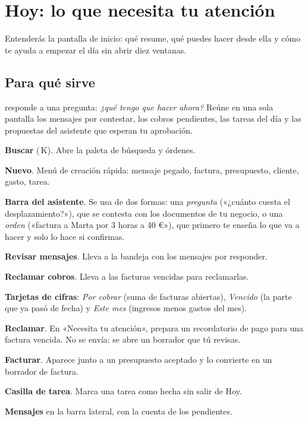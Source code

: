 \chapter{Hoy: lo que necesita tu atención}\label{cap:hoy}

\begin{objbox}
Entenderás la pantalla de inicio: qué resume, qué puedes hacer desde ella y cómo te ayuda a empezar el día sin abrir diez ventanas.
\end{objbox}

\section{Para qué sirve}
 responde a una pregunta: \emph{¿qué tengo que hacer ahora?} Reúne en una sola pantalla los mensajes por contestar, los cobros pendientes, las tareas del día y las propuestas del asistente que esperan tu aprobación.

\begin{leyenda}
\item[\mk{1}] \textbf{Buscar} (\cmd\,K). Abre la paleta de búsqueda y órdenes.
\item[\mk{2}] \textbf{Nuevo}. Menú de creación rápida: mensaje pegado, factura, presupuesto, cliente, gasto, tarea.
\item[\mk{3}] \textbf{Barra del asistente}. Se usa de dos formas: una \emph{pregunta} («¿cuánto cuesta el desplazamiento?»), que se contesta con los documentos de tu negocio, o una \emph{orden} («factura a Marta por 3 horas a 40 €»), que primero te enseña lo que va a hacer y solo lo hace si confirmas.
\item[\mk{4}] \textbf{Revisar mensajes}. Lleva a la bandeja con los mensajes por responder.
\item[\mk{5}] \textbf{Reclamar cobros}. Lleva a las facturas vencidas para reclamarlas.
\item[\mk{6}] \textbf{Tarjetas de cifras}: \emph{Por cobrar} (suma de facturas abiertas), \emph{Vencido} (la parte que ya pasó de fecha) y \emph{Este mes} (ingresos menos gastos del mes).
\item[\mk{7}] \textbf{Reclamar}. En «Necesita tu atención», prepara un recordatorio de pago para una factura vencida. No se envía: se abre un borrador que tú revisas.
\item[\mk{8}] \textbf{Facturar}. Aparece junto a un presupuesto aceptado y lo convierte en un borrador de factura.
\item[\mk{9}] \textbf{Casilla de tarea}. Marca una tarea como hecha sin salir de Hoy.
\item[\mk{10}] \textbf{Mensajes} en la barra lateral, con la cuenta de los pendientes.
\end{leyenda}

